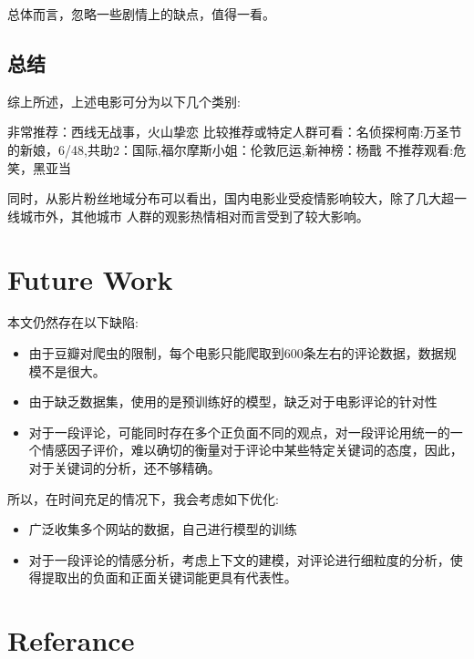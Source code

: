 \documentclass[12pt]{article}
\begin{document}
总体而言，忽略一些剧情上的缺点，值得一看。

\subsection*{总结}
综上所述，上述电影可分为以下几个类别:

非常推荐：西线无战事，火山挚恋
比较推荐或特定人群可看：名侦探柯南:万圣节的新娘，6/48,共助2：国际,福尔摩斯小姐：伦敦厄运,新神榜：杨戬
不推荐观看:危笑，黑亚当

同时，从影片粉丝地域分布可以看出，国内电影业受疫情影响较大，除了几大超一线城市外，其他城市
人群的观影热情相对而言受到了较大影响。

\section{Future Work}
本文仍然存在以下缺陷: 
\begin{itemize}
    \item 由于豆瓣对爬虫的限制，每个电影只能爬取到600条左右的评论数据，数据规模不是很大。
    \item 由于缺乏数据集，使用的是预训练好的模型，缺乏对于电影评论的针对性
    \item 对于一段评论，可能同时存在多个正负面不同的观点，对一段评论用统一的一个情感因子评价，难以确切的衡量对于评论中某些特定关键词的态度，因此，对于关键词的分析，还不够精确。
\end{itemize}

所以，在时间充足的情况下，我会考虑如下优化:
\begin{itemize}
    \item 广泛收集多个网站的数据，自己进行模型的训练
    \item 对于一段评论的情感分析，考虑上下文的建模，对评论进行细粒度的分析，使得提取出的负面和正面关键词能更具有代表性。\cite{pottsDynaSentDynamicBenchmark2020}
\end{itemize}

\section{Referance}
 
\end{document}

